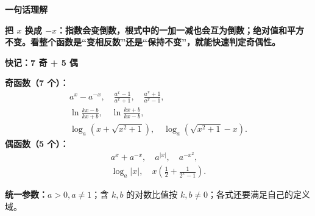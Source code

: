 \clearpage
\begin{summarybox}
\textbf{\textcolor{CSummary}{一句话理解}}

\textbf{把 $x$ 换成 $-x$：指数会变倒数，根式中的一加一减也会互为倒数；绝对值和平方不变。看整个函数是“变相反数”还是“保持不变”，就能快速判定奇偶性。}

\textbf{\textcolor{CSummary}{快记：7 奇 + 5 偶}}

\textbf{奇函数（7 个）：}
\[
\begin{gathered}
 a^x-a^{-x},\quad \frac{a^x-1}{a^x+1},\quad
 \frac{a^x+1}{a^x-1},\\
 \ln\frac{kx-b}{kx+b},\quad \ln\frac{kx+b}{kx-b},\\
 \log_a(x+\sqrt{x^2+1}),\quad
 \log_a(\sqrt{x^2+1}-x).
\end{gathered}
\]
\textbf{偶函数（5 个）：}
\[
\begin{gathered}
 a^x+a^{-x},\quad a^{|x|},\quad a^{-x^2},\\
 \log_a|x|,\quad
 x\left(\frac12+\frac1{2^x-1}\right).
\end{gathered}
\]

\textbf{统一参数：}$a>0,a\ne1$；含 $k,b$ 的对数比值按 $k,b\ne0$；各式还要满足自己的定义域。
\end{summarybox}
\clearpage
